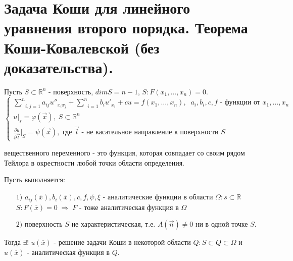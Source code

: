 \chapter{Задача Коши для линейного уравнения второго порядка. Теорема Коши-Ковалевской (без доказательства).}
\label{cha:2}

\begin{definition}\label{cha:2/def:1}
	\hfill \break
	Пусть $S \subset \mathbb{R}^n$ - поверхность, $dim S = n-1$, $S: F(x_1, \dots, x_n) = 0$.
	$$\begin{cases}
		\underset{i,j=1}{\overset{n}{\sum}}a_{i j} u''_{x_i x_j} + \underset{i=1}{\overset{n}{\sum}}b_i u'_{x_i} + c u = f (x_1, \dots, x_n), \;\; a_i, b_i, c, f\text{ - функции от }x_1, \dots, x_n \\
		u|_s = \varphi (\overrightarrow{x}), \; S \subset \mathbb{R}^n \\
		\frac{\partial u}{\partial \overrightarrow{l}}|_S = \psi (\overrightarrow{x}), \text{ где } \overrightarrow{l} \text{ - не касательное направление к поверхности } S
	\end{cases}$$
\end{definition}

\begin{remem}\label{cha:1/remem:1}
	 вещественного переменного - это функция, которая совпадает со своим рядом Тейлора в окрестности любой точки области определения.
\end{remem}

\begin{theorem}\label{cha:2/the:1}
	Пусть выполняется:
	\begin{itemize}
		\item[$1)$] $a_{i j} (\overline{x}), b_i (\overline{x}), c, f, \psi, \xi$ - аналитические функции в области $\Omega: s \subset \mathbb{R}$\\
		$S: F(\overline{x}) = 0 \; \Rightarrow \; F$ - тоже аналитическая функция в $\Omega$
		\item[$2)$] поверхность $S$ не характеристическая, т.е. $A(\overrightarrow{n}) \not = 0$ ни в одной точке $S$.
	\end{itemize}
	Тогда $\exists ! \; u(\overline{x})$ - решение задачи Коши в некоторой области $Q: S \subset Q \subset \Omega$ и $u(\overline{x})$ - аналитическая функция в $Q$.
\end{theorem}

